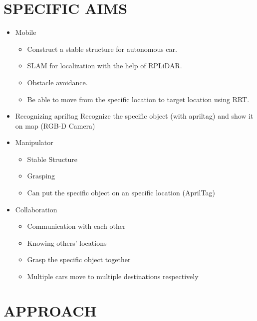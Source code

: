 \documentclass[a4paper, 10pt, conference]{ieeeconf}      %
\begin{document}
\section{SPECIFIC AIMS}
\begin{itemize}
\item Mobile
\begin{itemize}
	\item Construct a stable structure for autonomous car.
	\item SLAM for localization with the help of RPLiDAR.
	\item Obstacle avoidance.
	\item Be able to move from the specific location to target location using RRT.
\end{itemize}

\item Recognizing apriltag 
Recognize the specific object (with apriltag) and show it on map (RGB-D Camera)

\item Manipulator
\begin{itemize}
	\item Stable Structure
	\item Grasping
	\item Can put the specific object on an specific location (AprilTag)
\end{itemize}

\item Collaboration
\begin{itemize}
	\item Communication with each other
	\item Knowing others' locations
	\item Grasp the specific object together
	\item Multiple cars move to multiple destinations respectively
\end{itemize}
\end{itemize}

\section{APPROACH}
\end{document}
